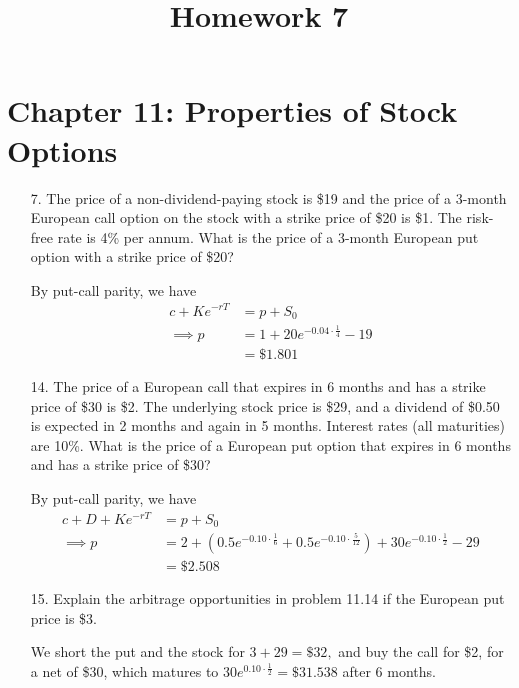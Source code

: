 \documentclass{article}
\begin{document}
\title{Homework 7}
\maketitle
\thispagestyle{fancy}

\section*{Chapter 11: Properties of Stock Options}

\begin{itemize}
	\item[7.] The price of a non-dividend-paying stock is \$19 and the price of a 3-month European call option on the stock with a strike price of \$20 is \$1. The risk-free rate is 4\% per annum. What is the price of a 3-month European put option with a strike price of \$20?
		\begin{soln}
			By put-call parity, we have
			\begin{align*}
				c + Ke^{-rT} &= p + S_0 \\
				\implies p &= 1 + 20e^{-0.04\cdot \frac{1}{4}} - 19 \\
				&= \boxed{\$1.801}
			\end{align*}
		\end{soln}

	\item[14.] The price of a European call that expires in 6 months and has a strike price of \$30 is \$2. The underlying stock price is \$29, and a dividend of \$0.50 is expected in 2 months and again in 5 months. Interest rates (all maturities) are 10\%. What is the price of a European put option that expires in 6 months and has a strike price of \$30?
		\begin{soln}
			By put-call parity, we have
			\begin{align*}
				c+D+Ke^{-rT} &= p+S_0 \\
				\implies p &= 2 + \left( 0.5e^{-0.10\cdot \frac{1}{6}} + 0.5e^{-0.10\cdot \frac{5}{12}} \right) + 30e^{-0.10\cdot \frac{1}{2}} - 29 \\
				&= \boxed{\$2.508}
			\end{align*}
		\end{soln}
 
	\item[15.] Explain the arbitrage opportunities in problem 11.14 if the European put price is \$3.
		\begin{soln}
			We short the put and the stock for $3+29=\$32,$ and buy the call for \$2, for a net of \$30, which matures to $30e^{0.10\cdot \frac{1}{2}} = \$31.538$ after 6 months. 
			

\end{soln}
\end{itemize}
\end{document}

